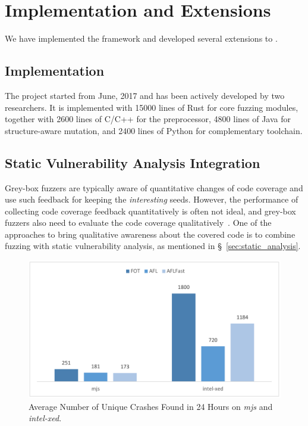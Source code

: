 \section{Implementation and Extensions}\label{sec:app}

We have implemented the {\FOT} framework and developed several extensions to {\FOT}.

\subsection{Implementation}

The {\FOT} project started from June, 2017 and has been actively developed by two researchers. It is implemented with 15000 lines of Rust for core fuzzing modules, together with 2600 lines of C/C++ for the preprocessor, 4800 lines of Java for structure-aware mutation, and 2400 lines of Python for complementary toolchain.



\subsection{Static Vulnerability Analysis Integration}\label{subsec:sva}



Grey-box fuzzers are typically aware of quantitative changes of code coverage and use such feedback for keeping the \textit{interesting} seeds.
However, the performance of collecting code coverage feedback quantitatively is often not ideal, and grey-box fuzzers also need to evaluate the code coverage qualitatively~\cite{Bohme:2016:CGF}.
One of the approaches to bring qualitative awareness about the covered code is to combine fuzzing with static vulnerability analysis, as mentioned in \S~\ref{sec:static_analysis}.

\begin{figure}[t]
	\centering
	\includegraphics[width=0.75\columnwidth]{res/fot/moo_result.pdf}
	\caption{Average Number of Unique Crashes Found in 24 Hours on \textit{mjs} and \textit{intel-xed}.}
	\label{fig:moo_result}
\end{figure}


